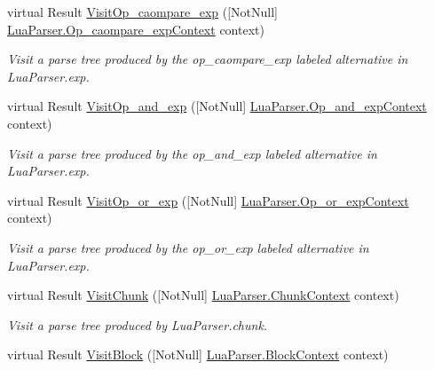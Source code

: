 \begin{DoxyCompactItemize}
virtual Result \mbox{\hyperlink{classzlua_1_1_lua_base_visitor_aff0d9ab4eaa061d503aa4f0b644551e6}{Visit\+Op\+\_\+caompare\+\_\+exp}} (\mbox{[}Not\+Null\mbox{]} \mbox{\hyperlink{classzlua_1_1_lua_parser_1_1_op__caompare__exp_context}{Lua\+Parser.\+Op\+\_\+caompare\+\_\+exp\+Context}} context)
\begin{DoxyCompactList}\small\item\em Visit a parse tree produced by the {\ttfamily op\+\_\+caompare\+\_\+exp} labeled alternative in Lua\+Parser.\+exp. \end{DoxyCompactList}\item 
virtual Result \mbox{\hyperlink{classzlua_1_1_lua_base_visitor_a44cd305cf8712913e46a7ed7171206d7}{Visit\+Op\+\_\+and\+\_\+exp}} (\mbox{[}Not\+Null\mbox{]} \mbox{\hyperlink{classzlua_1_1_lua_parser_1_1_op__and__exp_context}{Lua\+Parser.\+Op\+\_\+and\+\_\+exp\+Context}} context)
\begin{DoxyCompactList}\small\item\em Visit a parse tree produced by the {\ttfamily op\+\_\+and\+\_\+exp} labeled alternative in Lua\+Parser.\+exp. \end{DoxyCompactList}\item 
virtual Result \mbox{\hyperlink{classzlua_1_1_lua_base_visitor_a46d6ab454b46b7fa9b6a2ebda7514299}{Visit\+Op\+\_\+or\+\_\+exp}} (\mbox{[}Not\+Null\mbox{]} \mbox{\hyperlink{classzlua_1_1_lua_parser_1_1_op__or__exp_context}{Lua\+Parser.\+Op\+\_\+or\+\_\+exp\+Context}} context)
\begin{DoxyCompactList}\small\item\em Visit a parse tree produced by the {\ttfamily op\+\_\+or\+\_\+exp} labeled alternative in Lua\+Parser.\+exp. \end{DoxyCompactList}\item 
virtual Result \mbox{\hyperlink{classzlua_1_1_lua_base_visitor_a9d1632ababc782344ac2324282dab1e3}{Visit\+Chunk}} (\mbox{[}Not\+Null\mbox{]} \mbox{\hyperlink{classzlua_1_1_lua_parser_1_1_chunk_context}{Lua\+Parser.\+Chunk\+Context}} context)
\begin{DoxyCompactList}\small\item\em Visit a parse tree produced by Lua\+Parser.\+chunk. \end{DoxyCompactList}\item 
virtual Result \mbox{\hyperlink{classzlua_1_1_lua_base_visitor_ad48d1aadd0185f15f13db086072bbe08}{Visit\+Block}} (\mbox{[}Not\+Null\mbox{]} \mbox{\hyperlink{classzlua_1_1_lua_parser_1_1_block_context}{Lua\+Parser.\+Block\+Context}} context)

\end{DoxyCompactItemize}
